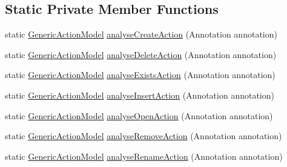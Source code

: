 \subsection*{Static Private Member Functions}
\begin{DoxyCompactItemize}
\item 
static \hyperlink{interfacecom_1_1poly_1_1nlp_1_1filekommander_1_1views_1_1models_1_1_generic_action_model}{Generic\-Action\-Model} \hyperlink{classcom_1_1poly_1_1nlp_1_1filekommander_1_1file_1_1actions_1_1_analyse_action_a62e07128db9a8df65417a02d84068e01}{analyse\-Create\-Action} (Annotation annotation)
\item 
static \hyperlink{interfacecom_1_1poly_1_1nlp_1_1filekommander_1_1views_1_1models_1_1_generic_action_model}{Generic\-Action\-Model} \hyperlink{classcom_1_1poly_1_1nlp_1_1filekommander_1_1file_1_1actions_1_1_analyse_action_a9970d61dcf513507ed64217bd16838ab}{analyse\-Delete\-Action} (Annotation annotation)
\item 
static \hyperlink{interfacecom_1_1poly_1_1nlp_1_1filekommander_1_1views_1_1models_1_1_generic_action_model}{Generic\-Action\-Model} \hyperlink{classcom_1_1poly_1_1nlp_1_1filekommander_1_1file_1_1actions_1_1_analyse_action_a683b8ce8891c552588d2247fbd9f4328}{analyse\-Exists\-Action} (Annotation annotation)
\item 
static \hyperlink{interfacecom_1_1poly_1_1nlp_1_1filekommander_1_1views_1_1models_1_1_generic_action_model}{Generic\-Action\-Model} \hyperlink{classcom_1_1poly_1_1nlp_1_1filekommander_1_1file_1_1actions_1_1_analyse_action_a75f845c14e6046304b2ad4ac56d0f56f}{analyse\-Insert\-Action} (Annotation annotation)
\item 
static \hyperlink{interfacecom_1_1poly_1_1nlp_1_1filekommander_1_1views_1_1models_1_1_generic_action_model}{Generic\-Action\-Model} \hyperlink{classcom_1_1poly_1_1nlp_1_1filekommander_1_1file_1_1actions_1_1_analyse_action_a4da9b25dc9bdae9570ef0459276548ad}{analyse\-Open\-Action} (Annotation annotation)
\item 
static \hyperlink{interfacecom_1_1poly_1_1nlp_1_1filekommander_1_1views_1_1models_1_1_generic_action_model}{Generic\-Action\-Model} \hyperlink{classcom_1_1poly_1_1nlp_1_1filekommander_1_1file_1_1actions_1_1_analyse_action_aea934abe03154ab654a156add6133093}{analyse\-Remove\-Action} (Annotation annotation)
\item 
static \hyperlink{interfacecom_1_1poly_1_1nlp_1_1filekommander_1_1views_1_1models_1_1_generic_action_model}{Generic\-Action\-Model} \hyperlink{classcom_1_1poly_1_1nlp_1_1filekommander_1_1file_1_1actions_1_1_analyse_action_aade5e40cbf6a964d4b95b81815cea68f}{analyse\-Rename\-Action} (Annotation annotation)

\end{DoxyCompactItemize}

